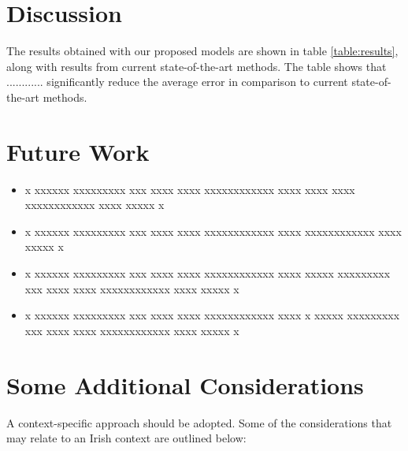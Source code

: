 \documentclass[conference]{IEEEtran}
\begin{document}
\section{Discussion}
The results obtained with our proposed models are shown in table \ref{table:results}, along with results from current state-of-the-art methods. The table shows that ............ significantly reduce the average error in comparison to current state-of-the-art methods. 



\section{Future Work}

\begin{itemize}
\item x xxxxxx xxxxxxxxx xxx xxxx xxxx xxxxxxxxxxxx xxxx  xxxx xxxx xxxxxxxxxxxx xxxx xxxxx x
\item x xxxxxx xxxxxxxxx xxx xxxx xxxx xxxxxxxxxxxx xxxx xxxxxxxxxxxx xxxx xxxxx x
\item x xxxxxx xxxxxxxxx xxx xxxx xxxx xxxxxxxxxxxx xxxx xxxxx xxxxxxxxx xxx xxxx xxxx xxxxxxxxxxxx xxxx xxxxx x
\item x xxxxxx xxxxxxxxx xxx xxxx xxxx xxxxxxxxxxxx xxxx x xxxxx xxxxxxxxx xxx xxxx xxxx xxxxxxxxxxxx xxxx xxxxx x

\end{itemize}
\section{Some Additional Considerations}
 A context-specific approach should be adopted. Some of the considerations that may relate to an Irish context are outlined below: 
\end{document}

